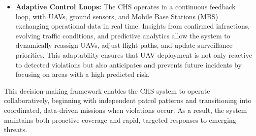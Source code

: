 \begin{itemize}
    \item \textbf{Adaptive Control Loops:}  
    The CHS operates in a continuous feedback loop, with UAVs, ground sensors, and Mobile Base Stations (MBS) exchanging operational data in real time. Insights from confirmed infractions, evolving traffic conditions, and predictive analytics allow the system to dynamically reassign UAVs, adjust flight paths, and update surveillance priorities. This adaptability ensures that UAV deployment is not only reactive to detected violations but also anticipates and prevents future incidents by focusing on areas with a high predicted risk.
\end{itemize}

This decision-making framework enables the CHS system to operate collaboratively, beginning with independent patrol patterns and transitioning into coordinated, data-driven missions when violations occur. As a result, the system maintains both proactive coverage and rapid, targeted responses to emerging threats.






